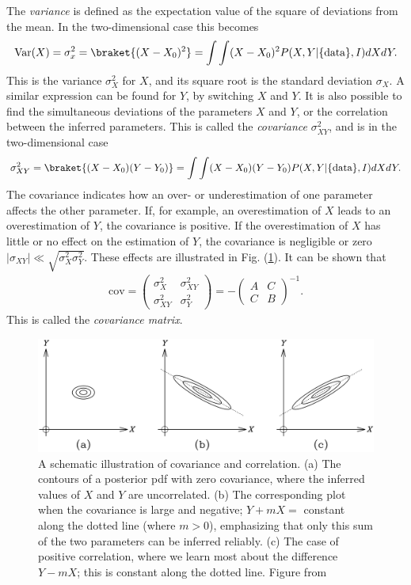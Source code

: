 \documentclass[twoside,english]{uiofysmaster}
\begin{document}
The \textit{variance} is defined as the expectation value of the square of deviations from the mean. In the two-dimensional case this becomes \cite{sivia2006data}
\begin{align}
\text{Var}(X) = \sigma_x^2 = \braket{(X - X_0)^2} = \int \int (X - X_0)^2 P (X, Y | \{\text{data}\}, I) dXdY.
\end{align}
This is the variance $\sigma_X^2$ for $X$, and its square root is the standard deviation $\sigma_X$. A similar expression can be found for $Y$, by switching $X$ and $Y$. It is also possible to find the simultaneous deviations of the parameters $X$ and $Y$, or the correlation between the inferred parameters. This is called the \textit{covariance} $\sigma_{XY}^2$, and is in the two-dimensional case
\begin{align}
\sigma_{XY}^2 = \braket{(X - X_0) (Y - Y_0)} =\int \int (X - X_0) (Y - Y_0) P (X, Y | \{\text{data}\}, I) dXdY.
\end{align}
The covariance indicates how an over- or underestimation of one parameter affects the other parameter. If, for example, an overestimation of $X$ leads to an overestimation of $Y$, the covariance is positive. If the overestimation of $X$ has little or no effect on the estimation of $Y$, the covariance is negligible or zero $|\sigma_{XY}| \ll \sqrt{\sigma_X^2 \sigma_Y^2}$. These effects are illustrated in Fig. (\ref{Fig:: gaussian process : Covariance illustrated}). It can be shown that \cite{sivia2006data}
\begin{align}
\text{cov} = 
\begin{pmatrix}
\sigma_X^2 & \sigma_{XY}^2\\
\sigma_{XY}^2 & \sigma_Y^2
\end{pmatrix}
= - \begin{pmatrix}
A & C\\
C & B
\end{pmatrix}^{-1}.
\end{align}
This is called the \textit{covariance matrix}.

\begin{figure}
\centering
\includegraphics[scale=0.25]{sivia_covariance_correlation.png}
\caption{A schematic illustration of covariance and correlation. (a) The contours of a posterior pdf with zero covariance, where the inferred values of $X$ and $Y$ are uncorrelated. (b) The corresponding plot when the covariance is large and negative; $Y + mX =$ constant along the dotted line (where $m > 0$), emphasizing that only this sum of the two parameters can be inferred reliably. (c) The case of positive correlation, where we learn most about the difference $Y − mX$; this is constant along the dotted line. Figure from \cite{sivia2006data}}
\label{Fig:: gaussian process : Covariance illustrated}
\end{figure}
\end{document}

